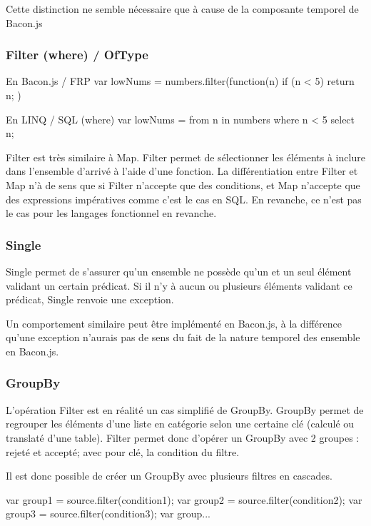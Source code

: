       Cette distinction ne semble nécessaire que à cause de la composante temporel de Bacon.js

    \subsubsection{Filter (where) / OfType}
      En Bacon.js / FRP
        var lowNums = 
          numbers.filter(function(n){
            if (n < 5)
              return n;
          })

      En LINQ / SQL (where)
        var lowNums = 
          from n in numbers 
          where n < 5 
          select n;

      Filter est très similaire à Map.
      Filter permet de sélectionner les éléments à inclure dans l'ensemble d'arrivé à l'aide d'une fonction.
      La différentiation entre Filter et Map n'à de sens que si Filter n'accepte que des conditions, et Map n'accepte que des expressions impératives comme c'est le cas en SQL.
      En revanche, ce n'est pas le cas pour les langages fonctionnel en revanche.

    \subsubsection{Single}

      Single permet de s'assurer qu'un ensemble ne possède qu'un et un seul élément validant un certain prédicat.
      Si il n'y à aucun ou plusieurs éléments validant ce prédicat, Single renvoie une exception.

      Un comportement similaire peut être implémenté en Bacon.js, à la différence qu'une exception n'aurais pas de sens du fait de la nature temporel des ensemble en Bacon.js.

    \subsubsection{GroupBy}

      L'opération Filter est en réalité un cas simplifié de GroupBy.
      GroupBy permet de regrouper les éléments d'une liste en catégorie selon une certaine clé (calculé ou translaté d'une table).
      Filter permet donc d'opérer un GroupBy avec 2 groupes : rejeté et accepté; avec pour clé, la condition du filtre.

      Il est donc possible de créer un GroupBy avec plusieurs filtres en cascades.

      var group1 = source.filter(condition1);
      var group2 = source.filter(condition2);
      var group3 = source.filter(condition3);
      var group...

